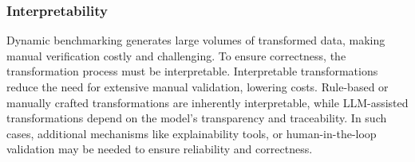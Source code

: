 \subsubsection{Interpretability} 
Dynamic benchmarking generates large volumes of transformed data, making manual verification costly and challenging. To ensure correctness, the transformation process must be interpretable. Interpretable transformations reduce the need for extensive manual validation, lowering costs. Rule-based or manually crafted transformations are inherently interpretable, while LLM-assisted transformations depend on the model's transparency and traceability. In such cases, additional mechanisms like explainability tools, or human-in-the-loop validation may be needed to ensure reliability and correctness.



